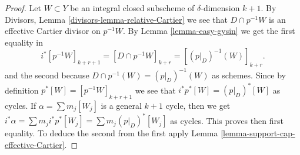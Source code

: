 \documentclass[10pt,a4paper]{amsart}
\theoremstyle{plain}
\theoremstyle{definition}
\theoremstyle{remark}
\numberwithin{equation}{subsection}
\begin{document}
\begin{proof}
Let $W \subset Y$ be an integral closed subscheme of $\delta$-dimension
$k + 1$. By Divisors, Lemma \ref{divisors-lemma-relative-Cartier}
we see that $D \cap p^{-1}W$ is an effective
Cartier divisor on $p^{-1}W$. By Lemma \ref{lemma-easy-gysin}
we get the first equality in
$$
i^*[p^{-1}W]_{k + r + 1} =
[D \cap p^{-1}W]_{k + r} =
[(p|_D)^{-1}(W)]_{k + r}.
$$
and the second because $D \cap p^{-1}(W) = (p|_D)^{-1}(W)$ as schemes.
Since by definition $p^*[W] = [p^{-1}W]_{k + r + 1}$ we see that
$i^*p^*[W] = (p|_D)^*[W]$ as cycles. If $\alpha = \sum m_j[W_j]$ is a
general $k + 1$ cycle, then we get
$i^*\alpha = \sum m_j i^*p^*[W_j] = \sum m_j(p|_D)^*[W_j]$ as cycles.
This proves then first equality. To deduce the second from the
first apply Lemma \ref{lemma-support-cap-effective-Cartier}.
\end{proof}
\end{document}
